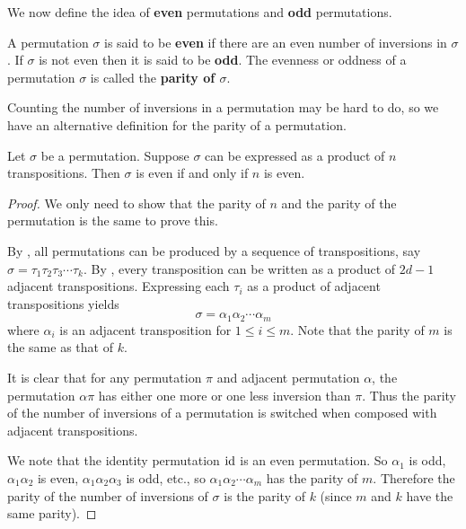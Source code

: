 We now define the idea of \textbf{even} permutations and \textbf{odd} permutations.
\begin{definition}
    A permutation $\sigma$ is said to be \textbf{even} if there are an even number of inversions in $\sigma$. If $\sigma$ is not even then it is said to be \textbf{odd}. The evenness or oddness of a permutation $\sigma$ is called the \textbf{parity of $\sigma$}.
\end{definition}

Counting the number of inversions in a permutation may be hard to do, so we have an alternative definition for the parity of a permutation.

\begin{theorem}\label{thrm-parity-of-permutation}
    Let $\sigma$ be a permutation. Suppose $\sigma$ can be expressed as a product of $n$ transpositions. Then $\sigma$ is even if and only if $n$ is even.
\end{theorem}
\begin{proof}
    We only need to show that the parity of $n$ and the parity of the permutation is the same to prove this.

    By , all permutations can be produced by a sequence of transpositions, say $\sigma = \tau_1\tau_2\tau_3\cdots\tau_k$. By , every transposition can be written as a product of $2d - 1$ adjacent transpositions. Expressing each $\tau_i$ as a product of adjacent transpositions yields
    \[
        \sigma = \alpha_1\alpha_2\cdots\alpha_m
    \]
    where $\alpha_i$ is an adjacent transposition for $1 \leq i \leq m$. Note that the parity of $m$ is the same as that of $k$.

    It is clear that for any permutation $\pi$ and adjacent permutation $\alpha$, the permutation $\alpha\pi$ has either one more or one less inversion than $\pi$. Thus the parity of the number of inversions of a permutation is switched when composed with adjacent transpositions.

    We note that the identity permutation $\mathrm{id}$ is an even permutation. So $\alpha_1$ is odd, $\alpha_1\alpha_2$ is even, $\alpha_1\alpha_2\alpha_3$ is odd, etc., so $\alpha_1\alpha_2\cdots\alpha_m$ has the parity of $m$. Therefore the parity of the number of inversions of $\sigma$ is the parity of $k$ (since $m$ and $k$ have the same parity).
\end{proof}

